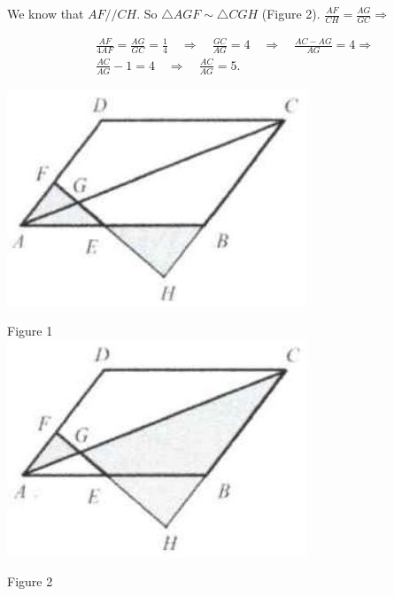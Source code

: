 \documentclass{article}
\begin{document}
We know that \(A F / / C H\). So \(\triangle A G F \sim \triangle C G H\) (Figure 2). \(\frac{A F}{C H}=\frac{A G}{G C} \Rightarrow\)

\[
\begin{aligned}
& \frac{A F}{4 A F}=\frac{A G}{G C}=\frac{1}{4} \quad \Rightarrow \quad \frac{G C}{A G}=4 \quad \Rightarrow \quad \frac{A C-A G}{A G}=4 \Rightarrow \\
& \frac{A C}{A G}-1=4 \quad \Rightarrow \quad \frac{A C}{A G}=5 .
\end{aligned}
\]

\begin{center}
\includegraphics[width=\textwidth]{images/124.jpg}
\end{center}

Figure 1\\
\centering
\includegraphics[width=\textwidth]{images/124(2).jpg}

Figure 2
\end{document}
